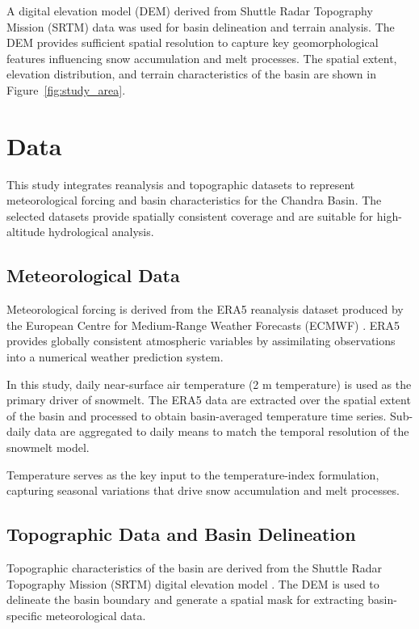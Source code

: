 \documentclass[11pt]{article}
\begin{document}
A digital elevation model (DEM) derived from Shuttle Radar Topography Mission (SRTM) data was used for basin delineation and terrain analysis. The DEM provides sufficient spatial resolution to capture key geomorphological features influencing snow accumulation and melt processes. The spatial extent, elevation distribution, and terrain characteristics of the basin are shown in Figure~\ref{fig:study_area}.


	
\section{Data}

This study integrates reanalysis and topographic datasets to represent meteorological forcing and basin characteristics for the Chandra Basin. The selected datasets provide spatially consistent coverage and are suitable for high-altitude hydrological analysis.

\subsection{Meteorological Data}

Meteorological forcing is derived from the ERA5 reanalysis dataset produced by the European Centre for Medium-Range Weather Forecasts (ECMWF) \citep{Hersbach2020}. ERA5 provides globally consistent atmospheric variables by assimilating observations into a numerical weather prediction system.

In this study, daily near-surface air temperature (2 m temperature) is used as the primary driver of snowmelt. The ERA5 data are extracted over the spatial extent of the basin and processed to obtain basin-averaged temperature time series. Sub-daily data are aggregated to daily means to match the temporal resolution of the snowmelt model.

Temperature serves as the key input to the temperature-index formulation, capturing seasonal variations that drive snow accumulation and melt processes.

\subsection{Topographic Data and Basin Delineation}

Topographic characteristics of the basin are derived from the Shuttle Radar Topography Mission (SRTM) digital elevation model \citep{Farr2007}. The DEM is used to delineate the basin boundary and generate a spatial mask for extracting basin-specific meteorological data.
\end{document}
